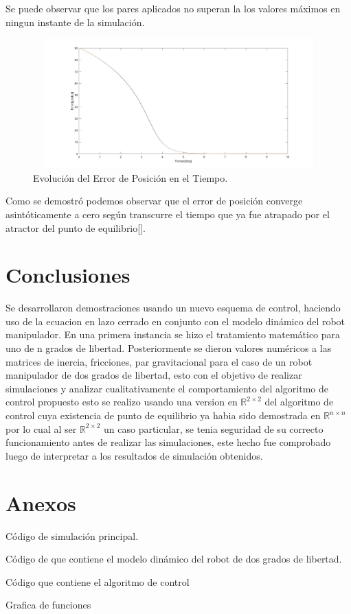 \documentclass[12pt]{article}
\begin{document}
\begin{enumerate}
    Se puede observar que los pares aplicados no superan la los valores máximos en ningun instante de la simulación.
    
    \begin{figure}[h]
        \centering
        \includegraphics[width=14cm, height=5cm]{IMAGENES/error.jpg}
        \caption{Evolución del Error de Posición en el Tiempo.}
        \label{fig:error}
    \end{figure}

    Como se demostró podemos observar que el error de posición converge asintóticamente a cero según transcurre el tiempo que ya fue atrapado por el atractor del punto de equilibrio[\cite{reyes2011robotica}].
\end{enumerate}
\section{Conclusiones}
Se desarrollaron demostraciones usando un nuevo esquema de control, haciendo uso de la ecuacion en lazo cerrado en conjunto con el modelo dinámico del robot manipulador. En una primera instancia se hizo el tratamiento matemático para uno  de n grados de libertad. Posteriormente se dieron valores numéricos a las matrices de inercia, fricciones, par gravitacional para el caso de un robot manipulador de dos grados de libertad, esto con el objetivo de realizar simulaciones y analizar cualitativamente el comportamiento del algoritmo de control propuesto esto se realizo usando una version en $\mathbb{R}^{2\times2}$ del algoritmo de control cuya existencia de punto de equilibrio ya habia sido demostrada en $\mathbb{R}^{n\times n}$ por lo cual al ser $\mathbb{R}^{2\times2}$ un caso particular, se tenia seguridad de su correcto funcionamiento antes de realizar las simulaciones, este hecho fue comprobado luego de interpretar a los resultados de simulación obtenidos.



\newpage
\section{Anexos}
Código de simulación principal.

Código de que contiene el modelo dinámico del robot de dos grados de libertad.

\newpage
Código que contiene el algoritmo de control

Grafica de funciones

\end{document}
